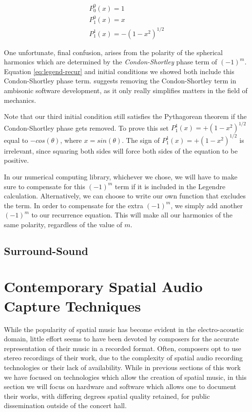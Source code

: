 \begin{equation}
\begin{array}{l}
P_{0}^{0}(x)=1 \\
P_{1}^{0}(x)=x \\
P_{1}^{1}(x)=-\left(1-x^{2}\right)^{1 / 2}
\end{array}
\label{eq:general-legendre}
\end{equation}

One unfortunate, final confusion, arises from the polarity of the spherical harmonics which are determined by the \textit{Condon-Shortley} phase term of $(-1)^m$. Equation \ref{eq:legend-recur} and initial conditions we showed both include this Condon-Shortley phase term. \cite{nachbar2011ambix} suggests removing the Condon-Shortley term in ambisonic software development, as it only really simplifies matters in the field of mechanics.

Note that our third initial condition still satisfies the Pythagorean theorem if the Condon-Shortley phase gets removed. To prove this set $P_{1}^{1}(x)=+\left(1-x^{2}\right)^{1 / 2}$ equal to $-cos(\theta)$, where $x = sin(\theta)$. The sign of $P_{1}^{1}(x)=+\left(1-x^{2}\right)^{1 / 2}$ is irrelevant, since squaring both sides will force both sides of the equation to be positive. 

In our numerical computing library, whichever we chose, we will have to make sure to compensate for this $(-1)^m$ term if it is included in the Legendre calculation. Alternatively, we can choose to write our own function that excludes the term. In order to compensate for the extra $(-1)^m$, we simply add another $(-1)^m$ to our recurrence equation. This will make all our harmonics of the same polarity, regardless of the value of $m$. 

\subsection{Surround-Sound}

\section{Contemporary Spatial Audio Capture Techniques} \label{sec:contemp_audio_capture}

While the popularity of spatial music has become evident in the electro-acoustic domain, little effort seems to have been devoted by composers for the accurate representation of their music in a recorded format. Often, composers opt to use stereo recordings of their work, due to the complexity of spatial audio recording technologies or their lack of availability. While in previous sections of this work we have focused on technologies which allow the creation of spatial music, in this section we will focus on hardware and software which allows one to document their works, with differing degrees spatial quality retained, for public dissemination outside of the concert hall. 

